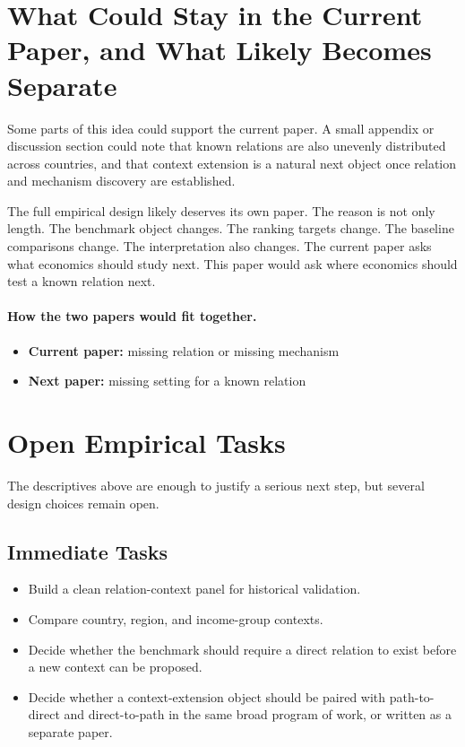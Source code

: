 \documentclass[11pt]{article}
\begin{document}
\section{What Could Stay in the Current Paper, and What Likely Becomes Separate}
Some parts of this idea could support the current paper. A small appendix or discussion section could note that known relations are also unevenly distributed across countries, and that context extension is a natural next object once relation and mechanism discovery are established.

The full empirical design likely deserves its own paper. The reason is not only length. The benchmark object changes. The ranking targets change. The baseline comparisons change. The interpretation also changes. The current paper asks what economics should study next. This paper would ask where economics should test a known relation next.

\paragraph{How the two papers would fit together.}
\begin{itemize}
    \item \textbf{Current paper:} missing relation or missing mechanism
    \item \textbf{Next paper:} missing setting for a known relation
\end{itemize}

\section{Open Empirical Tasks}
The descriptives above are enough to justify a serious next step, but several design choices remain open.

\subsection{Immediate Tasks}
\begin{itemize}
    \item Build a clean relation-context panel for historical validation.
    \item Compare country, region, and income-group contexts.
    \item Decide whether the benchmark should require a direct relation to exist before a new context can be proposed.
    \item Decide whether a context-extension object should be paired with path-to-direct and direct-to-path in the same broad program of work, or written as a separate paper.
\end{itemize}
\end{document}
